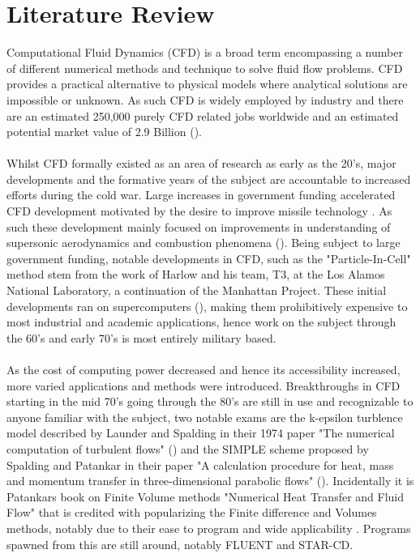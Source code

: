 \section{Literature Review}
Computational Fluid Dynamics (CFD) is a broad term encompassing a number of different numerical methods and technique to solve fluid flow problems. CFD provides a practical alternative to physical models where analytical solutions are impossible or unknown. As such CFD is widely employed by industry and there are an estimated 250,000 purely CFD related jobs worldwide and an estimated potential market value of 2.9 Billion (\cite{hanna_parry}). 
\\\\
Whilst CFD formally existed as an area of research as early as the 20's, major developments and the formative years of the subject are accountable to increased efforts during the cold war. Large increases in government funding accelerated CFD development motivated by the desire to improve missile technology \cite{hanna_parry}. As such these development mainly focused on improvements in understanding of supersonic aerodynamics and combustion phenomena (\cite{scientific_computing_world_2017}). Being subject to large government funding, notable developments in CFD, such as the "Particle-In-Cell" method stem from the work of Harlow and his team, T3, at the Los Alamos National Laboratory, a continuation of the Manhattan Project. These initial developments ran on supercomputers (\cite{harlow_2003}), making them prohibitively expensive to most industrial and academic applications, hence work on the subject through the 60's and early 70's is most entirely military based.
\\\\
As the cost of computing power decreased and hence its accessibility increased, more varied applications and methods were introduced. Breakthroughs in CFD starting in the mid 70's going through the 80's are still in use and recognizable to anyone familiar with the subject, two notable exams are the k-epsilon turblence model described by Launder and Spalding in their 1974 paper "The numerical computation of turbulent flows" (\cite{launder_spalding_1974}) and the SIMPLE scheme proposed by Spalding and Patankar in their paper "A calculation procedure for heat, mass and momentum transfer in three-dimensional parabolic flows" (\cite{patankar_spalding_1972}). Incidentally it is Patankars book on Finite Volume methods "Numerical Heat Transfer and Fluid Flow" that is credited with popularizing the Finite difference and Volumes methods, notably due to their ease to program and wide applicability \cite{hanna_parry}. Programs spawned from this are still around, notably FLUENT and STAR-CD.
